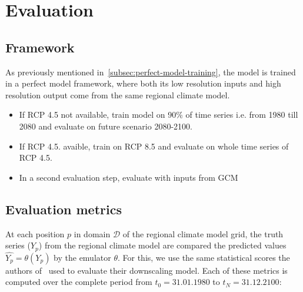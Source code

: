 \documentclass[a4paper,11pt,oneside]{report}
\begin{document}
\section{Evaluation}\label{sec:evaluation}

\subsection{Framework}\label{subsec:evaluation-framework}
As previously mentioned in~\ref{subsec:perfect-model-training}, the model is trained in a perfect model framework, where both its low resolution inputs and high resolution output come from the same regional climate model.
\begin{itemize}
\item If RCP 4.5 not available, train model on 90\% of time series i.e. from 1980 till 2080 and evaluate on future scenario 2080-2100. 
    \item If RCP 4.5. avaible, train on RCP 8.5 and evaluate on whole time series of RCP 4.5.
    \item In a second evaluation step, evaluate with inputs from GCM 
\end{itemize}


\subsection{Evaluation metrics}\label{subsec:evaluation-metrics}
At each position $p$ in domain $\mathcal{D} $ of the regional climate model grid, the truth series ($Y_{p}$) from the regional climate model are compared the predicted values $\widehat{Y_{p}}= \theta(Y_{p})$ by the emulator $\theta$. For this, we use the same statistical scores the authors of~\cite{Doury} used to evaluate their downscaling model. Each of these metrics is computed over the complete period from $t_{0}=31.01.1980$ to $t_{N}=31.12.2100$:
\end{document}
